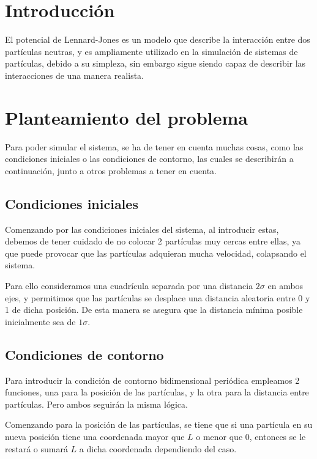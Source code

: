 \documentclass[11pt, twoside]{article} %
\begin{document}
\newpage

\setcounter{page}{0}
\tableofcontents
\newpage

\pagestyle{main}

\section{Introducción}

El potencial de Lennard-Jones es un modelo que describe la interacción entre dos
partículas neutras, y es ampliamente utilizado en la simulación de sistemas
de partículas, debido a su simpleza, sin embargo sigue siendo capaz de describir
las interacciones de una manera realista.

\section{Planteamiento del problema}

Para poder simular el sistema, se ha de tener en cuenta muchas cosas, como las 
condiciones iniciales o las condiciones de contorno, las cuales se describirán a 
continuación, junto a otros problemas a tener en cuenta.

\subsection{Condiciones iniciales}
Comenzando por las condiciones iniciales del sistema, al introducir estas, 
debemos de tener cuidado de no colocar 2 partículas muy cercas entre ellas, ya que 
puede provocar que las partículas adquieran mucha velocidad, colapsando el sistema.

Para ello consideramos una cuadrícula separada por una distancia $2\sigma$ en ambos 
ejes, y permitimos que las partículas se desplace una distancia aleatoria entre 0 y 1
de dicha posición. De esta manera se asegura que la distancia mínima posible inicialmente
sea de $1\sigma$. 
\subsection{Condiciones de contorno}

Para introducir la condición de contorno bidimensional periódica empleamos 
2 funciones, una para la posición de las partículas, y la otra para la 
distancia entre partículas. Pero ambos seguirán la misma lógica.

Comenzando para la posición de las partículas, se tiene que si una partícula en su
nueva posición tiene una coordenada mayor que $L$ o menor que 0, entonces se le 
restará o sumará $L$ a dicha coordenada dependiendo del caso. 
\end{document}

